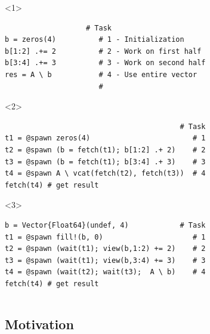 \documentclass{beamer}
\begin{document}
\begin{frame}[fragile]
\begin{columns}
\begin{example}
\begin{onlyenv}<1>
\begin{verbatim}
                   # Task
b = zeros(4)          # 1 - Initialization
b[1:2] .+= 2          # 2 - Work on first half
b[3:4] .+= 3          # 3 - Work on second half
res = A \ b           # 4 - Use entire vector
                      #
\end{verbatim}
\end{onlyenv}
\begin{onlyenv}<2>
\begin{verbatim}
                                         # Task
t1 = @spawn zeros(4)                        # 1
t2 = @spawn (b = fetch(t1); b[1:2] .+ 2)    # 2
t3 = @spawn (b = fetch(t1); b[3:4] .+ 3)    # 3
t4 = @spawn A \ vcat(fetch(t2), fetch(t3))  # 4
fetch(t4) # get result
\end{verbatim}
\end{onlyenv}
\begin{onlyenv}<3>
\begin{verbatim}    
b = Vector{Float64}(undef, 4)            # Task
t1 = @spawn fill!(b, 0)                     # 1
t2 = @spawn (wait(t1); view(b,1:2) += 2)    # 2
t3 = @spawn (wait(t1); view(b,3:4) += 3)    # 3
t4 = @spawn (wait(t2); wait(t3);  A \ b)    # 4
fetch(t4) # get result
\end{verbatim}
\end{onlyenv}
\end{example}



\end{columns}

\end{frame}

\subsection{Motivation}
\end{document}
